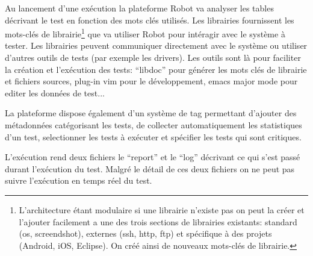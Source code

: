 Au lancement d'une exécution la plateforme Robot va analyser les tables décrivant le test en fonction des mots clés utilisés. Les librairies fournissent les mots-clés de librairie\footnote{L'architecture étant modulaire si une librairie n'existe pas on peut la créer et l'ajouter facilement a une des trois sections de librairies existants: standard (os, screendshot), externes (ssh, http, ftp) et spécifique à des projets (Android, iOS, Eclipse). On créé ainsi de nouveaux mots-clés de librairie.} que va utiliser Robot pour intéragir avec le système à tester. Les librairies peuvent communiquer directement avec le système ou utiliser d'autres outils de tests (par exemple les drivers). Les outils sont là pour faciliter la création et l'exécution des tests: ``libdoc'' pour générer les mots clés de librairie et fichiers sources, plug-in vim pour le développement, emacs major mode pour editer les données de test... 

La plateforme dispose également d'un système de tag permettant d'ajouter des métadonnées catégorisant les tests, de collecter automatiquement les statistiques d'un test, selectionner les tests à exécuter et spécifier les tests qui sont critiques. 

L'exécution rend deux fichiers le ``report'' et le ``log'' décrivant ce qui s'est passé durant l'exécution du test. Malgré le détail de ces deux fichiers on ne peut pas suivre l'exécution en temps réel du test.

